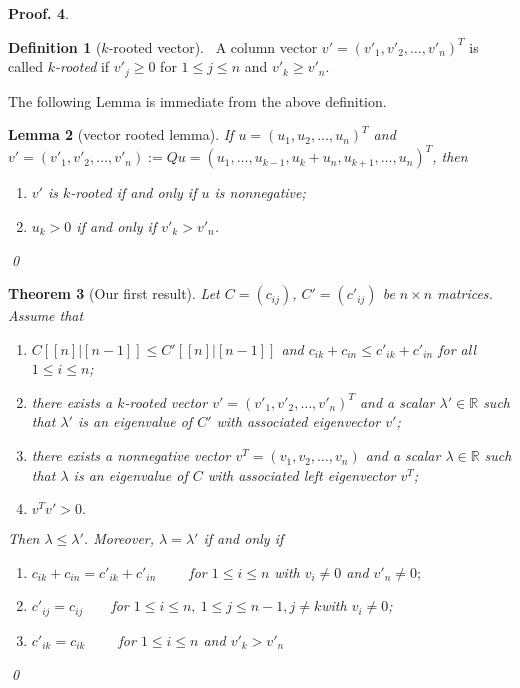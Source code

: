 \documentclass{article}
\theoremstyle{plain}
\newtheorem{thm}{Theorem}[subsection]
\newtheorem{lem}[thm]{Lemma}
\theoremstyle{definition}
\newtheorem{defn}[thm]{Definition}
\newtheorem{pof}[thm]{Proof.}
\begin{document}
\begin{pof}
\begin{defn}[$k$-rooted vector]
~A column vector $v'=(v'_1,v'_2,\ldots,v'_n)^T$ is called {\it $k$-rooted}  if $v'_{j} \geq 0$ for $1 \leq  j \leq n$ and $v'_k\geq v'_n.$
\end{defn}
\bigskip

The following Lemma is immediate from the above definition.
\bigskip

\begin{lem}[vector rooted lemma]\label{lem:rt_vec}
If $u=(u_1, u_2, \ldots, u_n)^T$ and $v'=(v'_1, v'_2, \ldots, v'_n):=Qu=(u_1,\ldots, u_{k-1},u_k+u_n, u_{k+1}, \ldots,  u_n)^T$, then
\begin{enumerate}[label=(\Roman*)]
\item \label{lem:rt_vec:en1}$v'$ is $k$-rooted  if and only if  $u$ is nonnegative;
\item $u_k>0$ if and only if $v'_k>v'_n$.
\end{enumerate}
\qed
\end{lem}

\begin{thm}[Our first result]\label{thm_main}
    Let $C=(c_{ij})$, $C'=(c'_{ij})$ be  $n\times n$ matrices.
Assume that
\begin{enumerate}[label=(\Roman*)]
\item \label{thm_main:condition_i} $C[[n]|[n-1]]\leq C'[[n]|[n-1]]$ and $c_{ik}+c_{in}\leq c'_{ik}+c'_{in}$ for all $1\leq i\leq n$;
\item \label{thm_main:condition_ii} there exists a $k$-rooted vector $v'=(v'_1, v'_2, \ldots, v'_n)^T$ and a scalar $\lambda'\in \mathbb{R}$
such that $\lambda'$ is an eigenvalue of $C'$ with associated eigenvector $v'$;
\item there exists a nonnegative vector $v^T=(v_1, v_2, \ldots, v_n)$ and a scalar $\lambda\in \mathbb{R}$ such that $\lambda$ is an eigenvalue of $C$ with associated left eigenvector $v^T$;
\item $v^Tv'>0.$
\end{enumerate}
 Then $\lambda\leq \lambda'$.
Moreover, $\lambda=\lambda'$
if and only if
\begin{enumerate}[label=(\alph*)]
    \item \label{thm_main:equ_cond_a} $c_{ik}+c_{in}=c'_{ik}+c'_{in} \qquad$  for $1\leq i\leq n$ with $v_i\not=0$ and $v'_n\not=0;$
    \item \label{thm_main:equ_cond_b} $c'_{ij}=c_{ij}\qquad $for $1\leq i\leq n,~1\leq j\leq n-1, j \neq k $with $v_i\ne 0 $;
    \item \label{thm_main:equ_cond_c} $c'_{ik}=c_{ik} \qquad $  for $1\leq i \leq n$ and $ v'_{k}>v'_n$ 
\end{enumerate} \qed
\end{thm}
% 




\end{pof}
\end{document}
